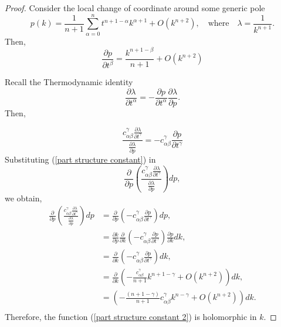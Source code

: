 \documentclass{article}
\theoremstyle{definition}
\begin{document}
\begin{proof}
Consider the local change of  coordinate around some generic pole
\begin{equation}\label{multivalued variable in the Hurwitz space}
p(k)=\frac{1}{n+1}\sum_{\alpha=0}^n t^{n+1-\alpha}k^{\alpha+1} +O(k^{n+2}), \quad \text{where} \quad \lambda=\frac{1}{k^{n+1}}.
\end{equation}
Then,
\begin{equation}
\frac{\partial p}{\partial t^{\beta}}=\frac{k^{n+1-\beta}}{n+1}  +O(k^{n+2})
\end{equation}


Recall the Thermodynamic identity 
\begin{equation}
\frac{\partial \lambda}{\partial t^{\alpha}}=-\frac{\partial p}{\partial t^{\alpha}}\frac{\partial \lambda}{\partial p}.
\end{equation}
Then,

\begin{equation}\label{part structure constant}
\frac{c_{\alpha\beta}^{\gamma}\frac{\partial \lambda}{\partial t^{\gamma}}}{\frac{\partial \lambda}{\partial p}}=-c_{\alpha\beta}^{\gamma}\frac{\partial p}{\partial t^{\gamma}}
\end{equation}
Substituting (\ref{part structure constant}) in 
\begin{equation}\label{part structure constant 2}
\frac{\partial}{\partial p}\left(\frac{c_{\alpha\beta}^{\gamma}\frac{\partial \lambda}{\partial t^{\gamma}}}{\frac{\partial \lambda}{\partial p}} \right)dp,
\end{equation}
we obtain,
\begin{equation}\label{part structure constant 3}
\begin{split}
\frac{\partial}{\partial p}\left(\frac{c_{\alpha\beta}^{\gamma}\frac{\partial \lambda}{\partial t^{\gamma}}}{\frac{\partial \lambda}{\partial p}} \right)dp&=\frac{\partial}{\partial p}\left( -c_{\alpha\beta}^{\gamma}\frac{\partial p}{\partial t^{\gamma}}
 \right)dp,\\
 &=\frac{\partial k}{\partial p}\frac{\partial}{\partial k}\left( -c_{\alpha\beta}^{\gamma}\frac{\partial p}{\partial t^{\gamma}}
 \right)\frac{\partial p}{\partial k}dk,\\
  &=\frac{\partial}{\partial k}\left( -c_{\alpha\beta}^{\gamma}\frac{\partial p}{\partial t^{\gamma}}
 \right)dk,\\
   &=\frac{\partial}{\partial k}\left( -\frac{c_{\alpha\beta}^{\gamma}}{n+1} k^{n+1-\gamma} +O(k^{n+2})
 \right)dk,\\
  &=\left(-\frac{\left(n+1-\gamma\right)}{n+1}c_{\alpha\beta}^{\gamma} k^{n-\gamma} +O(k^{n+2}) \right)dk.\\
 \end{split}
\end{equation}
Therefore, the function (\ref{part structure constant 2}) is holomorphic in $k$.



\end{proof}
\end{document}
